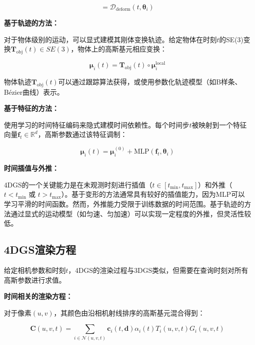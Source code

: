 \begin{equation}
[\Delta\boldsymbol{\mu}_i(t), \Delta\mathbf{s}_i(t), \Delta\mathbf{q}_i(t)] = \mathcal{D}_{\text{deform}}(t, \boldsymbol{\theta}_i)
\label{eq:deformation_network}
\end{equation}

\textbf{基于轨迹的方法：}

对于物体级别的运动，可以显式建模其刚体变换轨迹。给定物体在时刻$t$的SE(3)变换$\mathbf{T}_{\text{obj}}(t) \in SE(3)$，物体上的高斯基元相应变换：

\begin{equation}
\boldsymbol{\mu}_i(t) = \mathbf{T}_{\text{obj}}(t) \circ \boldsymbol{\mu}_i^{\text{local}}
\label{eq:trajectory_based_position}
\end{equation}

物体轨迹$\mathbf{T}_{\text{obj}}(t)$可以通过跟踪算法获得，或使用参数化轨迹模型（如B样条、Bézier曲线）表示。

\textbf{基于特征的方法：}

使用学习的时间特征编码来隐式建模时间依赖性。每个时间步$t$被映射到一个特征向量$\mathbf{f}_t \in \mathbb{R}^d$，高斯参数通过该特征调制：

\begin{equation}
\boldsymbol{\mu}_i(t) = \boldsymbol{\mu}_i^{(0)} + \text{MLP}(\mathbf{f}_t, \boldsymbol{\theta}_i)
\label{eq:feature_based_modulation}
\end{equation}

\textbf{时间插值与外推：}

4DGS的一个关键能力是在未观测时刻进行插值（$t \in [t_{\min}, t_{\max}]$）和外推（$t < t_{\min}$ 或 $t > t_{\max}$）。基于变形的方法通常具有较好的插值能力，因为MLP可以学习平滑的时间函数。然而，外推能力受限于训练数据的时间范围。基于轨迹的方法通过显式的运动模型（如匀速、匀加速）可以实现一定程度的外推，但灵活性较低。

\subsection{4DGS渲染方程}

给定相机参数和时刻$t$，4DGS的渲染过程与3DGS类似，但需要在查询时刻对所有高斯参数进行求值。

\textbf{时间相关的渲染方程：}

对于像素$(u,v)$，其颜色由沿相机射线排序的高斯基元混合得到：

\begin{equation}
\mathbf{C}(u,v,t) = \sum_{i \in \mathcal{N}(u,v,t)} \mathbf{c}_i(t, \mathbf{d}) \alpha_i(t) T_i(u,v,t) G_i(u,v,t)
\label{eq:4dgs_rendering}
\end{equation}

